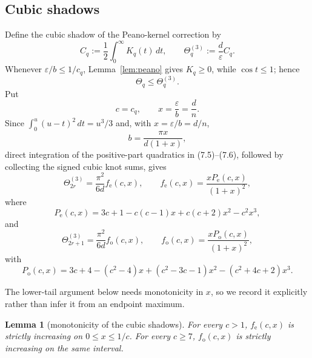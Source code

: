 \documentclass[11pt]{article}
\newtheorem{lemma}[theorem]{Lemma}
\theoremstyle{remark}
\begin{document}
\subsection{Cubic shadows}

Define the cubic shadow of the Peano-kernel correction by
\[
 C_q:=\frac12\int_0^\infty K_q(t)\,dt,
 \qquad
 \Theta_q^{(3)}:=\frac d\varepsilon C_q.
\tag{7.8}
\]
Whenever \(\varepsilon/b\le1/c_q\), Lemma~\ref{lem:peano} gives
\(K_q\ge0\), while \(\cos t\le1\); hence
\[
\Theta_q\le\Theta_q^{(3)}.
\tag{7.9}
\]
Put
\[
 c=c_q,\qquad x=\frac\varepsilon b=\frac dn.
\]
Since $\int_0^u(u-t)^2\,dt=u^3/3$ and, with $x=\varepsilon/b=d/n$,
\[
b=\frac{\pi x}{d(1+x)},
\]
direct integration of the positive-part quadratics in (7.5)--(7.6), followed by collecting the signed cubic knot sums, gives
\[
\Theta_{2r}^{(3)}=\frac{\pi^2}{6d}f_{\mathrm e}(c,x),
\qquad
f_{\mathrm e}(c,x)=\frac{xP_{\mathrm e}(c,x)}{(1+x)^2},
\tag{7.10}
\]
where
\[
P_{\mathrm e}(c,x)
=3c+1-c(c-1)x+c(c+2)x^2-c^2x^3,
\tag{7.11}
\]
and
\[
\Theta_{2r+1}^{(3)}=\frac{\pi^2}{6d}f_{\mathrm o}(c,x),
\qquad
f_{\mathrm o}(c,x)=\frac{xP_{\mathrm o}(c,x)}{(1+x)^2},
\tag{7.12}
\]
with
\[
P_{\mathrm o}(c,x)
=3c+4-(c^2-4)x+(c^2-3c-1)x^2-(c^2+4c+2)x^3.
\tag{7.13}
\]

The lower-tail argument below needs monotonicity in \(x\), so we record it explicitly rather than infer it from an endpoint maximum.

\begin{lemma}[monotonicity of the cubic shadows]\label{lem:shadowmono}
For every \(c>1\), \(f_{\mathrm e}(c,x)\) is strictly increasing on
\(0\le x\le1/c\).  For every \(c\ge7\),
\(f_{\mathrm o}(c,x)\) is strictly increasing on the same interval.
\end{lemma}
\end{document}
